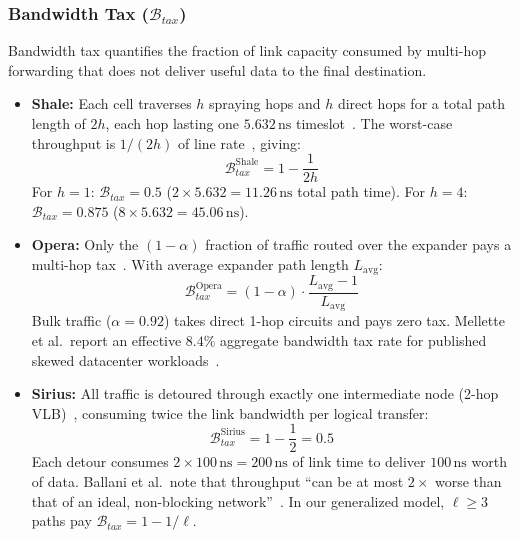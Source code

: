 \documentclass{article}
\begin{document}
    \subsubsection{Bandwidth Tax ($\mathcal{B}_{tax}$)}
    Bandwidth tax quantifies the fraction of link capacity consumed by multi-hop forwarding that does not deliver useful data to the final destination.
    \begin{itemize}
        \item \textbf{Shale:} Each cell traverses $h$ spraying hops and $h$ direct hops for a total path length of $2h$, each hop lasting one $5.632\,\text{ns}$ timeslot~\cite{shale}. The worst-case throughput is $1/(2h)$ of line rate~\cite{shale}, giving:
        \[
            \mathcal{B}_{tax}^{\text{Shale}} = 1 - \frac{1}{2h}
        \]
        For $h=1$: $\mathcal{B}_{tax} = 0.5$ ($2 \times 5.632 = 11.26\,\text{ns}$ total path time). For $h=4$: $\mathcal{B}_{tax} = 0.875$ ($8 \times 5.632 = 45.06\,\text{ns}$).
        \item \textbf{Opera:} Only the $(1-\alpha)$ fraction of traffic routed over the expander pays a multi-hop tax~\cite{opera}. With average expander path length $L_{\text{avg}}$:
        \[
            \mathcal{B}_{tax}^{\text{Opera}} = (1-\alpha) \cdot \frac{L_{\text{avg}} - 1}{L_{\text{avg}}}
        \]
        Bulk traffic ($\alpha = 0.92$) takes direct 1-hop circuits and pays zero tax. Mellette et al.\ report an effective $8.4\%$ aggregate bandwidth tax rate for published skewed datacenter workloads~\cite{opera}.
        \item \textbf{Sirius:} All traffic is detoured through exactly one intermediate node (2-hop VLB)~\cite{sirius}, consuming twice the link bandwidth per logical transfer:
        \[
            \mathcal{B}_{tax}^{\text{Sirius}} = 1 - \frac{1}{2} = 0.5
        \]
        Each detour consumes $2 \times 100\,\text{ns} = 200\,\text{ns}$ of link time to deliver $100\,\text{ns}$ worth of data. Ballani et al.\ note that throughput ``can be at most $2\times$ worse than that of an ideal, non-blocking network''~\cite{sirius}. In our generalized model, $\ell \geq 3$ paths pay $\mathcal{B}_{tax} = 1 - 1/\ell$.
    \end{itemize}
\end{document}
